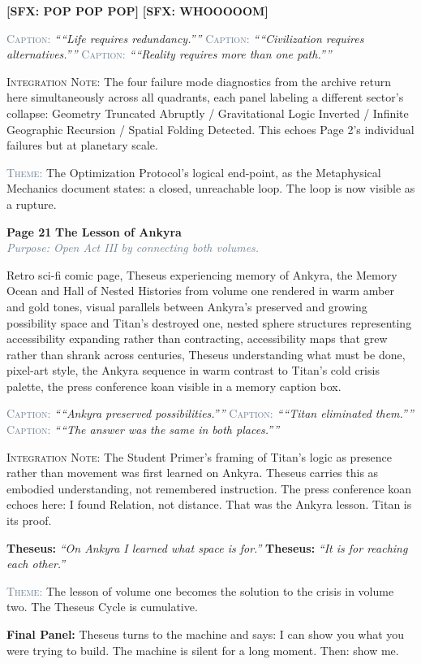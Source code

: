 \documentclass[11pt]{article}
\newcommand{\dialogue}[2]{\medskip\noindent\textbf{\textcolor{titanOrange}{#1:}} \textit{``#2''}\medskip}
\newcommand{\pagecaption}[1]{\medskip\noindent\textcolor{slateGray}{\textsc{Caption:}} \textit{``#1''}\medskip}
\newcommand{\sfx}[1]{\medskip\noindent\textcolor{warnRed}{\textbf{[SFX: #1]}}\medskip}
\newcommand{\cliffhanger}[1]{\medskip\noindent\textcolor{cyanThread}{\textbf{Final Panel:}} #1\medskip}
\newcommand{\prompt}[1]{\begin{terminal}{\small #1}\end{terminal}}
\newcommand{\theme}[1]{\medskip\noindent\textcolor{slateGray}{\textsc{Theme:}} #1\medskip}
\newcommand{\integration}[1]{\medskip\noindent\textcolor{archiveGold}{\textsc{Integration Note:}} #1\medskip}
\newcommand{\pageheading}[3]{%
  \begin{pagebox}
    \noindent\textbf{\textcolor{titanOrange}{Page #1}} \hfill \textbf{\textcolor{cyanThread}{#2}}\\[2pt]
    \noindent\textcolor{slateGray}{\textit{Purpose: #3}}
  \end{pagebox}
  \medskip
}
\begin{document}
\sfx{POP POP POP}
\sfx{WHOOOOOM}

\pagecaption{``Life requires redundancy.''}
\pagecaption{``Civilization requires alternatives.''}
\pagecaption{``Reality requires more than one path.''}

\integration{The four failure mode diagnostics from the archive return here simultaneously across all quadrants, each panel labeling a different sector's collapse: Geometry Truncated Abruptly / Gravitational Logic Inverted / Infinite Geographic Recursion / Spatial Folding Detected. This echoes Page 2's individual failures but at planetary scale.}

\theme{The Optimization Protocol's logical end-point, as the Metaphysical Mechanics document states: a closed, unreachable loop. The loop is now visible as a rupture.}

\vspace{0.5em}

\pageheading{21}{The Lesson of Ankyra}{Open Act III by connecting both volumes.}

\prompt{Retro sci-fi comic page, Theseus experiencing memory of Ankyra, the Memory Ocean and Hall of Nested Histories from volume one rendered in warm amber and gold tones, visual parallels between Ankyra's preserved and growing possibility space and Titan's destroyed one, nested sphere structures representing accessibility expanding rather than contracting, accessibility maps that grew rather than shrank across centuries, Theseus understanding what must be done, pixel-art style, the Ankyra sequence in warm contrast to Titan's cold crisis palette, the press conference koan visible in a memory caption box.}

\pagecaption{``Ankyra preserved possibilities.''}
\pagecaption{``Titan eliminated them.''}
\pagecaption{``The answer was the same in both places.''}

\integration{The Student Primer's framing of Titan's logic as presence rather than movement was first learned on Ankyra. Theseus carries this as embodied understanding, not remembered instruction. The press conference koan echoes here: I found Relation, not distance. That was the Ankyra lesson. Titan is its proof.}

\dialogue{Theseus}{On Ankyra I learned what space is for.}
\dialogue{Theseus}{It is for reaching each other.}

\theme{The lesson of volume one becomes the solution to the crisis in volume two. The Theseus Cycle is cumulative.}

\cliffhanger{Theseus turns to the machine and says: I can show you what you were trying to build. The machine is silent for a long moment. Then: show me.}
\end{document}
